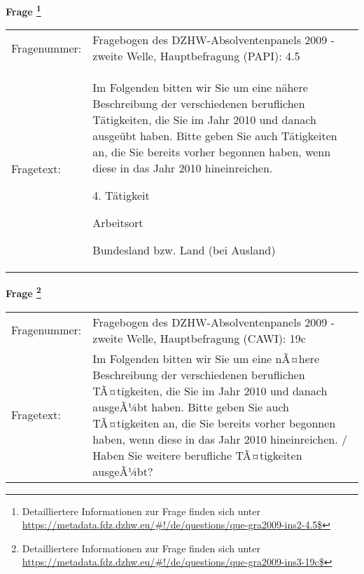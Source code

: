 				\vspace*{0.5cm}
                \noindent\textbf{Frage
	                \footnote{Detailliertere Informationen zur Frage finden sich unter
		              \url{https://metadata.fdz.dzhw.eu/\#!/de/questions/que-gra2009-ins2-4.5$}}}\\
				\begin{tabularx}{\hsize}{@{}lX}
					Fragenummer: &
					  Fragebogen des DZHW-Absolventenpanels 2009 - zweite Welle, Hauptbefragung (PAPI):
					  4.5
 \\
					Fragetext: & Im Folgenden bitten wir Sie um eine nähere Beschreibung der verschiedenen beruflichen Tätigkeiten, die Sie im Jahr 2010 und danach ausgeübt haben. Bitte geben Sie auch Tätigkeiten an, die Sie bereits vorher begonnen haben, wenn diese in das Jahr 2010 hineinreichen.\par  4. Tätigkeit\par  Arbeitsort\par  Bundesland bzw. Land (bei Ausland) \\
				\end{tabularx}
				\vspace*{0.5cm}
                \noindent\textbf{Frage
	                \footnote{Detailliertere Informationen zur Frage finden sich unter
		              \url{https://metadata.fdz.dzhw.eu/\#!/de/questions/que-gra2009-ins3-19c$}}}\\
				\begin{tabularx}{\hsize}{@{}lX}
					Fragenummer: &
					  Fragebogen des DZHW-Absolventenpanels 2009 - zweite Welle, Hauptbefragung (CAWI):
					  19c
 \\
					Fragetext: & Im Folgenden bitten wir Sie um eine nÃ¤here Beschreibung der verschiedenen beruflichen TÃ¤tigkeiten, die Sie im Jahr 2010 und danach ausgeÃ¼bt haben. Bitte geben Sie auch TÃ¤tigkeiten an, die Sie bereits vorher begonnen haben, wenn diese in das Jahr 2010 hineinreichen. / Haben Sie weitere berufliche TÃ¤tigkeiten ausgeÃ¼bt? \\
				\end{tabularx}





